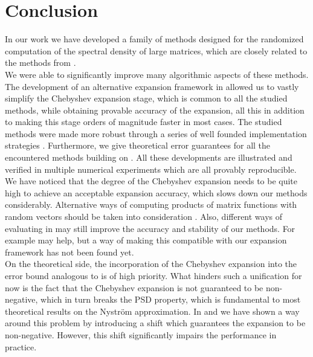 \chapter{Conclusion}
\label{chp:6-conclusion}

In our work we have developed a family of methods
designed for the randomized computation of the spectral density of large matrices,
which are closely related to the methods from \cite{lin2017randomized}.\\

We were able to
significantly improve many algorithmic aspects of these methods. The development
of an alternative expansion framework in 
allowed us to vastly simplify the Chebyshev expansion stage, which is common to all the
studied methods, while obtaining provable accuracy of the expansion, all this in
addition to making this stage orders of magnitude faster in most cases. 
The studied methods were made more robust through a series of well founded
implementation strategies .
Furthermore, we give theoretical error guarantees for all the encountered
methods building on \cite{he2023parameter}.
All these developments are illustrated and verified in multiple numerical experiments
which are all provably reproducible.\\

We have noticed that the degree of the Chebyshev expansion needs
to be quite high to achieve an acceptable expansion accuracy, which slows down
our methods considerably. Alternative ways of
computing products of matrix functions with random vectors should be taken into
consideration \cite{cortinovis2023speeding,ubaru2017lanczos}. Also, different ways
of evaluating  in 
may still improve the accuracy and stability of our methods. For example
\cite[algorithm~5.6]{tropp2023randomized} may help, but a way of making this
compatible with our expansion framework has not been found yet.\\

On the theoretical side, the incorporation of the Chebyshev expansion into the
error bound analogous to  is of high priority.
What hinders such a unification for now is the fact that the Chebyshev expansion
is not guaranteed to be non-negative, which in turn breaks the \gls{PSD} property,
which is fundamental to most theoretical results on the Nystr\"om approximation.
In  and 
we have shown a way around this problem by introducing a shift which guarantees
the expansion to be non-negative. However, this shift significantly impairs the
performance in practice.
